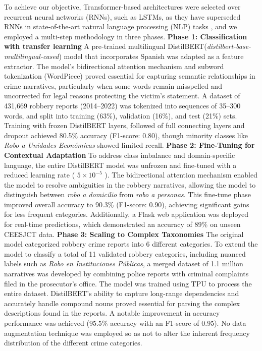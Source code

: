 \documentclass[onecolumn, journal, english, 12pt, a4paper]{IEEEtran} %
\theoremstyle{definition}
\begin{document}
To achieve our objective, Transformer-based architectures were
selected over recurrent neural networks (RNNs), such as LSTMs, as they
have superseded RNNs in state-of-the-art natural language processing
(NLP) tasks \cite{tunstall2022natural, vaswani2017attention}, and we
employed a multi-step methodology in three phases. \textbf{Phase 1:
  Classification with transfer learning} A pre-trained multilingual
DistilBERT(\emph{distilbert-base-multilingual-cased}) model
\cite{Sanh2019DistilBERTAD} that incorporates Spanish was adapted as a
feature extractor. The model’s bidirectional attention mechanism and
subword tokenization (WordPiece) proved essential for capturing
semantic relationships in crime narratives, particularly when some
words remain misspelled and uncorrected for legal reasons protecting
the victim's statement. A dataset of 431,669 robbery reports
(2014–2022) was tokenized into sequences of 35–300 words, and split
into training (63\%), validation (16\%), and test (21\%)
sets. Training with frozen DistilBERT layers, followed of full
connecting layers and dropout achieved 80.5\% accuracy (F1-score:
0.80), though minority classes like \textit{Robo a Unidades
  Económicas} showed limited recall. \textbf{Phase 2: Fine-Tuning for
  Contextual Adaptation} To address class imbalance and
domain-specific language, the entire DistilBERT model was unfrozen and
fine-tuned with a reduced learning rate ( $5 \times 10^{-5}$ ). The
bidirectional attention mechanism enabled the model to resolve
ambiguities in the robbery narratives, allowing the model to
distinguish between \textit{robo a domicilio} from \textit{robo a
  personas}. This fine-tune phase improved overall accuracy to 90.3\%
(F1-score: 0.90), achieving significant gains for less frequent
categories. Additionally, a Flask web application was deployed for
real-time predictions, which demonstrated an accuracy of 89\% on
unseen CEESJCT data. \textbf{Phase 3: Scaling to Complex Taxonomies}
The original model categorized robbery crime reports into 6 different
categories. To extend the model to classify a total of 11 validated
robbery categories, including nuanced labels such as \textit{Robo en
  Instituciones Públicas}, a merged dataset of 1.1 million narratives
was developed by combining police reports with criminal complaints
filed in the prosecutor's office. The model was trained using TPU to
process the entire dataset. DistilBERT’s ability to capture long-range
dependencies and accurately handle compound nouns proved essential for
parsing the complex descriptions found in the reports. A notable
improvement in accuracy performance was achieved (95.5\% accuracy with
an F1-score of 0.95). No data augmentation technique was employed so
as not to alter the inherent frequency distribution of the different
crime categories.
\end{document}
